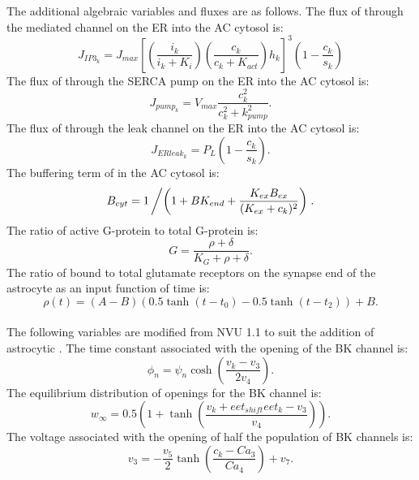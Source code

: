 	The additional algebraic variables and fluxes are as follows.
	The flux of \ca through the \ip mediated channel on the ER into the AC cytosol is: 
	\begin{equation}
	J_{IP3_k} = J_{max} \left[  \left(\frac{i_k}{i_k + K_i}\right) \left(\frac{c_k}{c_k + K_{act}}\right) h_k \right]^3
				\left( 1 - \frac{c_k}{s_k}  \right)  
	\end{equation}
	The flux of \ca through the SERCA pump on the ER into the AC cytosol is:
	\begin{equation}
	J_{pump_k} = V_{max} \frac{c_k^2}{c_k^2 + k_{pump}^2}.
	\end{equation}
	The flux of \ca through the leak channel on the ER into the AC cytosol is:
	\begin{equation}
	J_{ERleak_k} = P_L \left(  1 - \frac{c_k}{s_k}  \right).
	\end{equation}
	The buffering term of \ca in the AC cytosol is:
	\begin{equation}
	B_{cyt} = 1 \left/ \left( 1 + BK_{end} + \frac{K_{ex} B_{ex}}{(K_{ex} + c_k)^2}  \right) \right. .
	\end{equation}
	The ratio of active G-protein to total G-protein is:
	\begin{equation}
	G = \frac{\rho + \delta}{K_G + \rho + \delta}.
	\end{equation}
	The ratio of bound to total glutamate receptors on the synapse end of the astrocyte as an input function of time is:
	\begin{equation}
	\rho(t) = (A - B) \left( 0.5 \tanh (t - t_0) - 0.5 \tanh (t - t_2) \right) + B.
	\end{equation}
	\\
	
	The following variables are modified from NVU 1.1 to suit the addition of astrocytic \ca. 
	The time constant associated with the opening of the BK channel is:
	\begin{equation}
	\phi_n = \psi_n \cosh \left( \frac{v_k - v_3}{2 v_4} \right).
	\end{equation}
	The equilibrium distribution of openings for the BK channel is:
	\begin{equation}
	w_{\infty} = 0.5 \left( 1 + \tanh \left( \frac{v_k + eet_{shift} eet_k - v_3}{v_4}  \right)  \right).
	\end{equation}
	The voltage associated with the opening of half the population of BK channels is:
	\begin{equation}
	v_3 = - \frac{v_5}{2} \tanh \left(  \frac{c_k - Ca_3}{Ca_4}  \right) + v_7.
	\end{equation}
	
